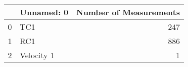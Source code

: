 \begin{tabular}{llr}
\toprule
{} &  Unnamed: 0 &  Number of Measurements \\
\midrule
0 &         TC1 &                     247 \\
1 &         RC1 &                     886 \\
2 &  Velocity 1 &                       1 \\
\bottomrule
\end{tabular}
